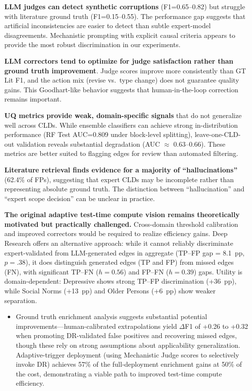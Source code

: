 \textbf{LLM judges can detect synthetic corruptions} (F1=0.65--0.82) but struggle with literature ground truth (F1=0.15--0.55). The performance gap suggests that artificial inconsistencies are easier to detect than subtle expert-model disagreements. Mechanistic prompting with explicit causal criteria appears to provide the most robust discrimination in our experiments.

\textbf{LLM correctors tend to optimize for judge satisfaction rather than ground truth improvement}. Judge scores improve more consistently than GT Lit F1, and the action mix (revise vs.\ type change) does not guarantee quality gains. This Goodhart-like behavior suggests that human-in-the-loop correction remains important.

\textbf{UQ metrics provide weak, domain-specific signals} that do not generalize well across CLDs. While ensemble classifiers can achieve strong in-distribution performance (RF Test AUC=0.809 under block-level splitting), leave-one-CLD-out validation reveals substantial degradation (AUC $\approx$ 0.63--0.66). These metrics are better suited to flagging edges for review than automated filtering.

\textbf{Literature retrieval finds evidence for a majority of ``hallucinations''} (62.4\% of FPs), suggesting that expert CLDs may be incomplete rather than representing absolute ground truth. The distinction between ``hallucination'' and ``expert scope decision'' can be unclear in practice.

\textbf{The original adaptive test-time compute vision remains theoretically motivated but practically challenged.} Cross-domain threshold calibration and improved correctors would be required to realize efficiency gains. Deep Research offers an alternative approach: while it cannot reliably discriminate expert-validated from LLM-generated edges in aggregate (TP--FP gap = 8.1~pp, $p = .38$), it does distinguish generated edges (TP and FP) from missed edges (FN), with significant TP--FN ($h=0.56$) and FP--FN ($h=0.39$) gaps. Utility is domain-dependent: Depressive shows strong TP--FP discrimination (+36~pp), while Social Norms (+13~pp) and Older Persons (+6~pp) show weaker separation.

\begin{itemize}[noitemsep]
    \item Ground truth enrichment analysis suggests substantial potential improvements---human-calibrated extrapolations yield $\Delta$F1 of +0.26 to +0.32 when promoting DR-validated false positives and recovering missed edges, though these rely on strong assumptions about applicability generalization. Adaptive-trigger deployment (using Mechanistic Judge scores to selectively invoke DR) achieves 57\% of the full-deployment enrichment gains at 50\% of the cost, demonstrating a viable path to improved test-time compute efficiency.
\end{itemize}

